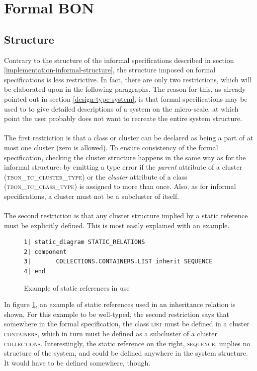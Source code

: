 \section{Formal BON}
\subsection{Structure}
Contrary to the structure of the informal specifications described in section \ref{implementation-informal-structure}, the structure imposed on formal specifications is less restrictive. In fact, there are only two restrictions, which will be elaborated upon in the following paragraphs. The reason for this, as already pointed out in section \ref{design-type-system}, is that formal specifications may be used to to give detailed descriptions of a system on the micro-scale, at which point the user probably does not want to recreate the entire system structure.
\paragraph{}
The first restriction is that a class or cluster can be declared as being a part of at most one cluster (zero is allowed). To ensure consistency of the formal specification, checking the cluster structure happens in the same way as for the informal structure: by emitting a type error if the \textit{parent} attribute of a cluster (\textsc{tbon\_tc\_cluster\_type}) or the \textit{cluster} attribute of a class (\textsc{tbon\_tc\_class\_type}) is assigned to more than once. Also, as for informal specifications, a cluster must not be a subcluster of itself.
\paragraph{}
The second restriction is that any cluster structure implied by a static reference must be explicitly defined. This is most easily explained with an example.
\begin{figure}[H]
{\footnotesize
\begin{verbatim}
1| static_diagram STATIC_RELATIONS
2| component
3|       COLLECTIONS.CONTAINERS.LIST inherit SEQUENCE
4| end
\end{verbatim}
}
\caption{Example of static references in use}
\label{fig:structure_static_references}
\end{figure}
In figure \ref{fig:structure_static_references}, an example of static references used in an inheritance relation is shown. For this example to be well-typed, the second restriction says that somewhere in the formal specification, the class \textsc{list} must be defined in a cluster \textsc{containers}, which in turn must be defined as a subcluster of a cluster \textsc{collections}. Interestingly, the static reference on the right, \textsc{sequence}, implies no structure of the system, and could be defined anywhere in the system structure. It would have to be defined somewhere, though.
